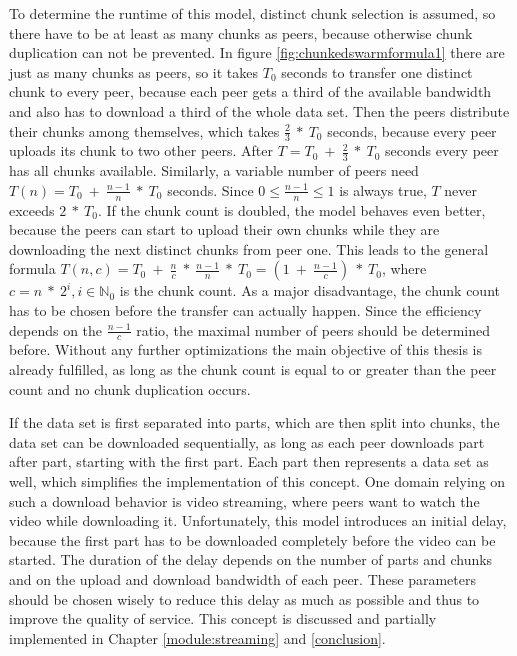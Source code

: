 To determine the runtime of this model, distinct chunk selection is assumed, so there have to be at least as many chunks as peers, because otherwise chunk duplication can not be prevented. In figure \ref{fig:chunkedswarmformula1} there are just as many chunks as peers, so it takes $T_0$ seconds to transfer one distinct chunk to every peer, because each peer gets a third of the available bandwidth and also has to download a third of the whole data set. Then the peers distribute their chunks among themselves, which takes $\frac{2}{3}\:*\:T_0$ seconds, because every peer uploads its chunk to two other peers. After $T = T_0\:+\:\frac{2}{3}\:*\:T_0$ seconds every peer has all chunks available. Similarly, a variable number of peers need $T(n) = T_0\:+\:\frac{n - 1}{n}\:*\:T_0$ seconds. Since $0 \leq \frac{n - 1}{n} \leq 1$ is always true, $T$ never exceeds $2\:*\:T_0$. If the chunk count is doubled, the model behaves even better, because the peers can start to upload their own chunks while they are downloading the next distinct chunks from peer one. This leads to the general formula $T(n, c) = T_0\:+\:\frac{n}{c}\:*\:\frac{n-1}{n}\:*\:T_0 = (1\:+\:\frac{n-1}{c})\:*\:T_0$, where $c = n\:*\:2^i, i \in \mathbb{N}_0$ is the chunk count. As a major disadvantage, the chunk count has to be chosen before the transfer can actually happen. Since the efficiency depends on the $\frac{n-1}{c}$ ratio, the maximal number of peers should be determined before. Without any further optimizations the main objective of this thesis is already fulfilled, as long as the chunk count is equal to or greater than the peer count and no chunk duplication occurs.

\vfill
\pagebreak

If the data set is first separated into parts, which are then split into chunks, the data set can be downloaded sequentially, as long as each peer downloads part after part, starting with the first part. Each part then represents a data set as well, which simplifies the implementation of this concept. One domain relying on such a download behavior is video streaming, where peers want to watch the video while downloading it. Unfortunately, this model introduces an initial delay, because the first part has to be downloaded completely before the video can be started. The duration of the delay depends on the number of parts and chunks and on the upload and download bandwidth of each peer. These parameters should be chosen wisely to reduce this delay as much as possible and thus to improve the quality of service. This concept is discussed and partially implemented in Chapter \ref{module:streaming} and \ref{conclusion}.

